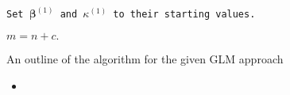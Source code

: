 \documentclass[12pt,a4paper]{article}\usepackage[]{graphicx}\usepackage[]{color}
\begin{document}
\begin{algorithm}[H]


 \texttt{Set $\boldsymbol{\beta}^{(1)}$ and $\kappa^{(1)}$ to their starting values.}

  $m = n + c.$

 \caption{An outline of the algorithm for the given GLM approach}
 \label{basealg}
\end{algorithm}


\begin{itemize}
\item
\end{itemize}

%
%
%
%
\end{document}
